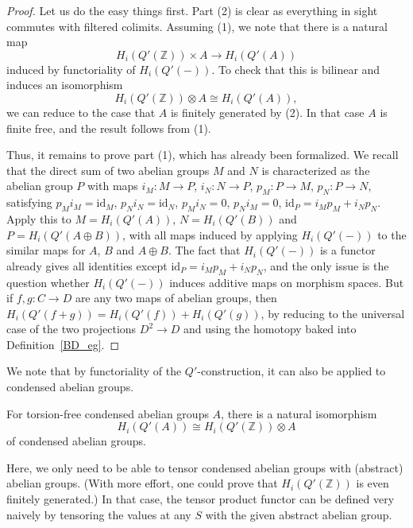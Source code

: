 \begin{proof}
  \leanok
  Let us do the easy things first. Part (2) is clear as everything in sight commutes with filtered colimits.
  Assuming (1), we note that there is a natural map
  \[ H_i(Q'(\mathbb Z))\times A\to H_i(Q'(A)) \]
  induced by functoriality of $H_i(Q'(-))$. To check that this is bilinear and induces an isomorphism
  \[ H_i(Q'(\mathbb Z))\otimes A\cong H_i(Q'(A)), \]
  we can reduce to the case that $A$ is finitely generated by (2).
  In that case $A$ is finite free, and the result follows from (1).

  Thus, it remains to prove part (1), which has already been formalized.
  We recall that the direct sum of two abelian groups $M$ and $N$
  is characterized as the abelian group $P$ with maps $i_M: M\to P$, $i_N: N\to P$, $p_M: P\to M$, $p_N: P\to N$,
  satisfying $p_M i_M=\mathrm{id}_M$, $p_N i_N = \mathrm{id}_N$, $p_M i_N=0$, $p_N i_M = 0$, $\mathrm{id}_P = i_M p_M + i_N p_N$.
  Apply this to $M=H_i(Q'(A))$, $N=H_i(Q'(B))$ and $P=H_i(Q'(A\oplus B))$,
  with all maps induced by applying $H_i(Q'(-))$ to the similar maps for $A$, $B$ and $A\oplus B$.
  The fact that $H_i(Q'(-))$ is a functor already gives all identities except $\mathrm{id}_P = i_M p_M + i_N p_N$,
  and the only issue is the question whether $H_i(Q'(-))$ induces additive maps on morphism spaces.
  But if $f,g: C\to D$ are any two maps of abelian groups, then $H_i(Q'(f+g)) = H_i(Q'(f))+H_i(Q'(g))$,
  by reducing to the universal case of the two projections $D^2\to D$ and using the homotopy baked into Definition~\ref{BD_eg}.
\end{proof}

We note that by functoriality of the $Q'$-construction, it can also be applied to condensed abelian groups.

\begin{corollary}
  \label{Qprime-Cond}
  \leanok
  For torsion-free condensed abelian groups $A$, there is a natural isomorphism
  \[ H_i(Q'(A))\cong H_i(Q'(\mathbb Z))\otimes A \]
  of condensed abelian groups.
\end{corollary}

Here, we only need to be able to tensor condensed abelian groups with (abstract) abelian groups.
(With more effort, one could prove that $H_i(Q'(\mathbb Z))$ is even finitely generated.)
In that case, the tensor product functor can be defined very naively by tensoring the values at any $S$ with the given abstract abelian group.

